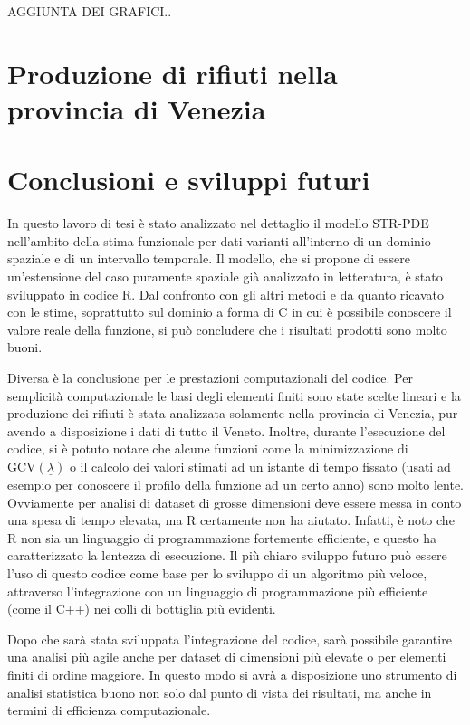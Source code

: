 \documentclass[a4paper,11pt,twoside,openright]{book}							%
\begin{document}
AGGIUNTA DEI GRAFICI..

\chapter{Produzione di rifiuti nella provincia di Venezia}
\label{cap:rifiuti}



\chapter{Conclusioni e sviluppi futuri}
\label{cap:conclusione}

In questo lavoro di tesi è stato analizzato nel dettaglio il modello STR-PDE nell'ambito della stima funzionale per dati varianti all'interno di un dominio spaziale e di un intervallo temporale. Il modello, che si propone di essere un'estensione del caso puramente spaziale già analizzato in letteratura, è stato sviluppato in codice R. Dal confronto con gli altri metodi e da quanto ricavato con le stime, soprattutto sul dominio a forma di C in cui è possibile conoscere il valore reale della funzione, si può concludere che i risultati prodotti sono molto buoni.

Diversa è la conclusione per le prestazioni computazionali del codice. Per semplicità computazionale le basi degli elementi finiti sono state scelte lineari e la produzione dei rifiuti è stata analizzata solamente nella provincia di Venezia, pur avendo a disposizione i dati di tutto il Veneto. Inoltre, durante l'esecuzione del codice, si è potuto notare che alcune funzioni come la minimizzazione di $\mathrm{GCV}(\underline \lambda)$ o il calcolo dei valori stimati ad un istante di tempo fissato (usati ad esempio per conoscere il profilo della funzione ad un certo anno) sono molto lente. Ovviamente per analisi di dataset di grosse dimensioni deve essere messa in conto una spesa di tempo elevata, ma R certamente non ha aiutato. Infatti, è noto che R non sia un linguaggio di programmazione fortemente efficiente, e questo ha caratterizzato la lentezza di esecuzione. Il più chiaro sviluppo futuro può essere l'uso di questo codice come base per lo sviluppo di un algoritmo più veloce, attraverso l'integrazione con un linguaggio di programmazione più efficiente (come il C++) nei colli di bottiglia più evidenti.

Dopo che sarà stata sviluppata l'integrazione del codice, sarà possibile garantire una analisi più agile anche per dataset di dimensioni più elevate o per elementi finiti di ordine maggiore. In questo modo si avrà a disposizione uno strumento di analisi statistica buono non solo dal punto di vista dei risultati, ma anche in termini di efficienza computazionale.
\end{document}
